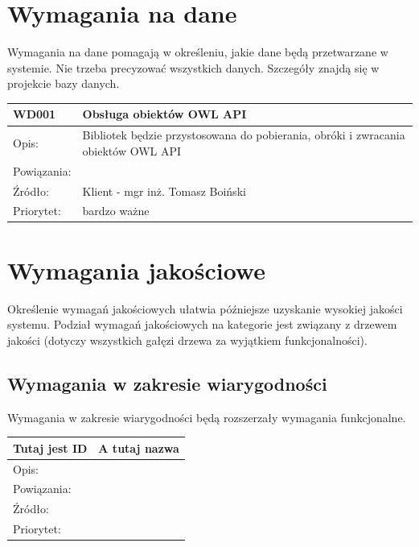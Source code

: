 \documentclass[a4paper,10pt]{article}
\begin{document}
\section{Wymagania na dane}

Wymagania na dane pomagają w określeniu, jakie dane będą przetwarzane w systemie. Nie trzeba precyzować wszystkich danych. Szczegóły znajdą się w projekcie bazy danych.


\begin{tabular}{|p{3cm}|p{9cm}|} \hline

WD001 & Obsługa obiektów OWL API \\ \hline
Opis: & Bibliotek będzie przystosowana do pobierania, obróki i zwracania obiektów OWL API \\ \hline
Powiązania: &  \\ \hline
Źródło: & Klient - mgr inż. Tomasz Boiński  \\ \hline
Priorytet: &  bardzo ważne \\ \hline

\end{tabular}


\section{Wymagania jakościowe}

Określenie wymagań jakościowych ułatwia późniejsze uzyskanie wysokiej jakości systemu. Podział wymagań jakościowych na kategorie jest związany z drzewem jakości (dotyczy wszystkich gałęzi drzewa za wyjątkiem funkcjonalności).

\subsection{Wymagania w zakresie wiarygodności}

Wymagania w zakresie wiarygodności będą rozszerzały wymagania funkcjonalne. 


\begin{tabular}{|p{3cm}|p{9cm}|} \hline

Tutaj jest ID & A tutaj nazwa \\ \hline
Opis: &  \\ \hline
Powiązania: &  \\ \hline
Źródło: &  \\ \hline
Priorytet: &  \\ \hline

\end{tabular}
\end{document}
